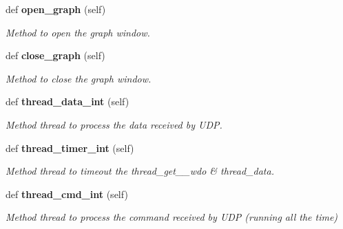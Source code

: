 \begin{DoxyCompactItemize}
def \textbf{ open\+\_\+graph} (self)
\begin{DoxyCompactList}\small\item\em Method to open the graph window. \end{DoxyCompactList}\item 
def \textbf{ close\+\_\+graph} (self)
\begin{DoxyCompactList}\small\item\em Method to close the graph window. \end{DoxyCompactList}\item 
def \textbf{ thread\+\_\+data\+\_\+int} (self)
\begin{DoxyCompactList}\small\item\em Method thread to process the data received by U\+DP. \end{DoxyCompactList}\item 
def \textbf{ thread\+\_\+timer\+\_\+int} (self)
\begin{DoxyCompactList}\small\item\em Method thread to timeout the thread\+\_\+get\+\_\+\_\+wdo \& thread\+\_\+data. \end{DoxyCompactList}\item 
def \textbf{ thread\+\_\+cmd\+\_\+int} (self)
\begin{DoxyCompactList}\small\item\em Method thread to process the command received by U\+DP (running all the time) \end{DoxyCompactList}\end{DoxyCompactItemize}
